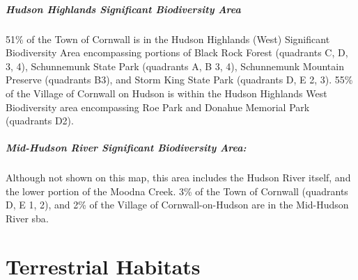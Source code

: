 \paragraph{\textit{Hudson Highlands Significant Biodiversity Area}}51\% of the 
Town of Cornwall is in the Hudson Highlands (West) Significant Biodiversity 
Area encompassing portions of Black Rock Forest (quadrants C, D, \/ 3, 4), 
Schunnemunk State Park (quadrants A, B \/ 3, 4), Schunnemunk Mountain Preserve 
(quadrants B3), and Storm King State Park (quadrants D, E \/ 2, 3). 55\% of the 
Village of Cornwall on Hudson is within the Hudson Highlands West Biodiversity 
area encompassing Roe Park and Donahue Memorial Park (quadrants D2). 

\paragraph{\textit{Mid-Hudson River Significant Biodiversity Area:}} Although not 
shown on this map, this area includes the Hudson River itself, and the lower 
portion of the Moodna Creek. 3\% of the Town of Cornwall (quadrants D, E \/ 1, 
2), and 2\% of the Village of Cornwall-on-Hudson are in the Mid-Hudson River 
\gls{sba}.


\label{map:aok}
\chapter{Terrestrial Habitats}\label{subsec:terrestrialhabitats}

